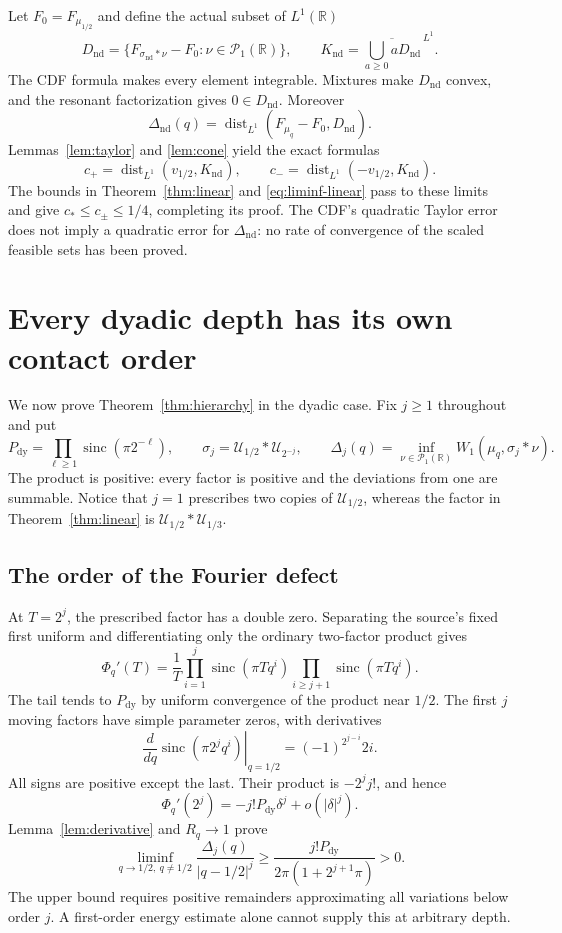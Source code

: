\documentclass[11pt,letterpaper]{article}
\theoremstyle{remark}\newtheorem{remark}[theorem]{Remark}
\newcommand{\R}{\mathbb R}\newcommand{\E}{\mathbb E}
\newcommand{\Un}{\mathcal U}\newcommand{\Law}{\mathcal L}
\newcommand{\Pone}{\mathcal P_1(\R)}
\newcommand{\sinc}{\operatorname{sinc}}
\newcommand{\dist}{\operatorname{dist}}
\begin{document}
Let $F_0=F_{\mu_{1/2}}$ and define the actual subset of $L^1(\R)$
\[
D_{\mathrm{nd}}=\{F_{\sigma_{\mathrm{nd}}*\nu}-F_0:\nu\in\Pone\},
\qquad K_{\mathrm{nd}}=\overline{\bigcup_{a\ge0}aD_{\mathrm{nd}}}^{\,L^1}.
\]
The CDF formula makes every element integrable. Mixtures make $D_{\mathrm{nd}}$ convex, and the resonant factorization gives $0\in D_{\mathrm{nd}}$. Moreover
\[
\Delta_{\mathrm{nd}}(q)=\dist_{L^1}(F_{\mu_q}-F_0,D_{\mathrm{nd}}).
\]
Lemmas~\ref{lem:taylor} and \ref{lem:cone} yield the exact formulas
\begin{equation}\label{eq:slopes}
c_+=\dist_{L^1}(v_{1/2},K_{\mathrm{nd}}),\qquad
c_-=\dist_{L^1}(-v_{1/2},K_{\mathrm{nd}}).
\end{equation}
The bounds in Theorem~\ref{thm:linear} and \eqref{eq:liminf-linear} pass to these limits and give $c_*\le c_\pm\le1/4$, completing its proof. The CDF's quadratic Taylor error does not imply a quadratic error for $\Delta_{\mathrm{nd}}$: no rate of convergence of the scaled feasible sets has been proved.

\section{Every dyadic depth has its own contact order}\label{sec:hierarchy}

We now prove Theorem~\ref{thm:hierarchy} in the dyadic case. Fix $j\ge1$ throughout and put
\[
P_{\mathrm{dy}}=\prod_{\ell\ge1}\sinc(\pi2^{-\ell}),\qquad
\sigma_j=\Un_{1/2}*\Un_{2^{-j}},\qquad
\Delta_j(q)=\inf_{\nu\in\Pone}W_1(\mu_q,\sigma_j*\nu).
\]
The product is positive: every factor is positive and the deviations from one are summable. Notice that $j=1$ prescribes two copies of $\Un_{1/2}$, whereas the factor in Theorem~\ref{thm:linear} is $\Un_{1/2}*\Un_{1/3}$.

\subsection{The order of the Fourier defect}
At $T=2^j$, the prescribed factor has a double zero. Separating the source's fixed first uniform and differentiating only the ordinary two-factor product gives
\[
\Phi_q'(T)=\frac1T\prod_{i=1}^j\sinc(\pi Tq^i)
                    \prod_{i\ge j+1}\sinc(\pi Tq^i).
\]
The tail tends to $P_{\mathrm{dy}}$ by uniform convergence of the product near $1/2$. The first $j$ moving factors have simple parameter zeros, with derivatives
\[
\left.\frac{d}{dq}\sinc(\pi2^jq^i)\right|_{q=1/2}
=(-1)^{2^{j-i}}2i.
\]
All signs are positive except the last. Their product is $-2^jj!$, and hence
\begin{equation}\label{eq:depth-defect}
\Phi_q'(2^j)=-j!P_{\mathrm{dy}}\delta^j+o(|\delta|^j).
\end{equation}
Lemma~\ref{lem:derivative} and $R_q\to1$ prove
\begin{equation}\label{eq:depth-lower}
\liminf_{q\to1/2,\ q\ne1/2}\frac{\Delta_j(q)}{|q-1/2|^j}
\ge\frac{j!P_{\mathrm{dy}}}{2\pi(1+2^{j+1}\pi)}>0.
\end{equation}
The upper bound requires positive remainders approximating all variations below order $j$. A first-order energy estimate alone cannot supply this at arbitrary depth.
\end{document}
